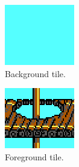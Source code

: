 \documentclass[book.tex]{subfiles}
\begin{document}
\begin{figure}[H]
\centering
\begin{subfigure}{.245\textwidth}
  \centering
  \includegraphics[width=.9\textwidth]{screenshots_300dpi/game/tile_composite_1.png}
  \caption{Background tile.}
\end{subfigure}%
\begin{subfigure}{.245\textwidth}
  \centering
  \includegraphics[width=.9\textwidth]{screenshots_300dpi/game/tile_composite_2.png}
  \caption{Foreground tile.}
\end{subfigure}
\begin{subfigure}{.245\textwidth}
  \centering

\end{subfigure}
\end{figure}
\end{document}
